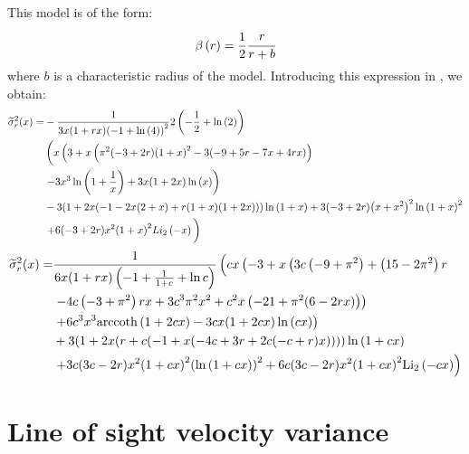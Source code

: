 This model is of the form:
%
\begin{equation}
    \beta \left(r\right) = \frac{1}{2}\cfrac{r}{r+b}
\end{equation}
%
where $b$ is a characteristic radius of the model. Introducing this expression
in , we obtain:
%
\begin{align}
    \widetilde\sigma_r^2(x)=&
        -\frac{1}{3 x (1+r x)
        {(-1+\ln\left(4\right))}^2}2
        \left(-\frac{1}{2}+\ln\left(2\right)\right)\nonumber\\
    &\left(x \left(3+x \left(\pi ^2 (-3+2 r)
        {(1+x)}^2-3 (-9+5 r-7 x+4 r x)
        \right)\right.\vphantom{\ln\left(1+\frac{1}{x}\right)}\right.
        \nonumber\\
    &\left.-3 x^3 \ln\left(1+\frac{1}{x}\right)+3 x (1+2 x)
        \ln\left(x\right)\right)\nonumber\\
    & -3 (1+2 x (-1-2 x (2+x)+r (1+x) (1+2 x)))
        \ln\left(1+x\right)+3 (-3+2 r) {\left(x+x^2\right)}^2
        \ln{\left(1+x\right)}^2\nonumber\\
    & \left.+6 (-3+2 r) x^2 {(1+x)}^2
        Li_2\left(-x\right)\vphantom{\ln\left(1+\frac{1}{x}\right)}\right)
        \nonumber\\
\end{align}
\begin{align}
    \widetilde\sigma_r^2(x)=&
        \frac{1}{6 x (1+r x) \left(-1+\frac{1}{1+c}+\ln c\right)}
        \left(c x \left(-3+x \left(3 c \left(-9+\pi ^2\right)+
        \left(15-2 \pi ^2\right) r\right.\right.
        \vphantom{{(1+c x)}^2}\right.\\
    &\left. -4 c \left(-3+\pi ^2\right) r x+
        3 c^3 \pi ^2 x^2+c^2 x \left(-21+\pi ^2 (6-2 r x)\right)\right)\\
    & \left.+6 c^3 x^3 {\rm arccoth} \left(1+2 c x\right)-
        3 c x (1+2 c x) \ln\left(c x\right)\right)\\
    &+3(1+2 x (r+c (-1+x (-4 c+3 r+2 c (-c+r) x))))
        \ln\left(1+c x\right)\\
    &\left.+3c(3 c-2 r) x^2 {(1+c x)}^2 {\left(\ln\left(1+c x\right)\right)}^2+
    6 c (3 c-2 r) x^2 {(1+c x)}^2 \mathrm{Li_2}\left(-c x\right)\right)\\
\end{align}

\section{Line of sight velocity variance}

